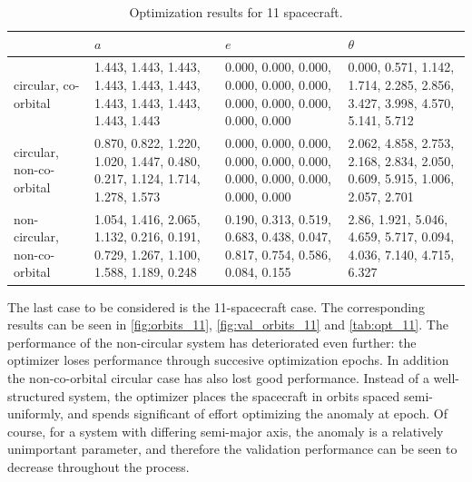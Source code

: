 \begin{table}[htbp]
\centering
\caption{Optimization results for 11 spacecraft.}
\label{tab:opt_11}
\begin{tabulary}{1.0\textwidth}{L|LLL}
                             & $a$                                                                                    & $e$                                                                             & $\theta$                                                                         \\ \hline
circular, co-orbital         & 1.443,   1.443, 1.443, 1.443, 1.443, 1.443, 1.443, 1.443, 1.443, 1.443, 1.443        & 0.000, 0.000, 0.000, 0.000,   0.000, 0.000, 0.000, 0.000, 0.000, 0.000, 0.000 & 0.000, 0.571, 1.142, 1.714,   2.285, 2.856, 3.427, 3.998, 4.570, 5.141, 5.712 \\
circular, non-co-orbital     & 0.870,   0.822, 1.220, 1.020, 1.447, 0.480, 0.217, 1.124, 1.714, 1.278, 1.573        & 0.000, 0.000, 0.000, 0.000,   0.000, 0.000, 0.000, 0.000, 0.000, 0.000, 0.000 & 2.062, 4.858, 2.753, 2.168,   2.834, 2.050, 0.609, 5.915, 1.006, 2.057, 2.701 \\
non-circular, non-co-orbital & 1.054,   1.416, 2.065, 1.132, 0.216, 0.191, 0.729, 1.267, 1.100, 1.588, 1.189, 0.248 & 0.190, 0.313, 0.519, 0.683,   0.438, 0.047, 0.817, 0.754, 0.586, 0.084, 0.155 & 2.86, 1.921, 5.046, 4.659,   5.717, 0.094, 4.036, 7.140, 4.715, 6.327        
\end{tabulary}
\end{table}

The last case to be considered is the 11-spacecraft case. The corresponding results can be seen in \autoref{fig:orbits_11}, \autoref{fig:val_orbits_11} and \autoref{tab:opt_11}. The performance of the non-circular system has deteriorated even further: the optimizer loses performance through succesive optimization epochs. In addition the non-co-orbital circular case has also lost good performance. Instead of a well-structured system, the optimizer places the spacecraft in orbits spaced semi-uniformly, and spends significant of effort optimizing the anomaly at epoch. Of course, for a system with differing semi-major axis, the anomaly is a relatively unimportant parameter, and therefore the validation performance can be seen to decrease throughout the process.\\

